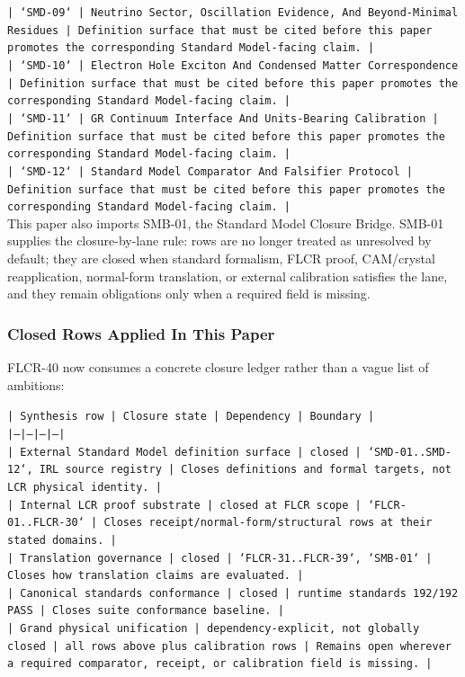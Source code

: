 \documentclass[11pt]{article}
\begin{document}
\noindent\texttt{| `SMD-09` | Neutrino Sector, Oscillation Evidence, And Beyond-Minimal Residues | Definition surface that must be cited before this paper promotes the corresponding Standard Model-facing claim. |}\\
\noindent\texttt{| `SMD-10` | Electron Hole Exciton And Condensed Matter Correspondence | Definition surface that must be cited before this paper promotes the corresponding Standard Model-facing claim. |}\\
\noindent\texttt{| `SMD-11` | GR Continuum Interface And Units-Bearing Calibration | Definition surface that must be cited before this paper promotes the corresponding Standard Model-facing claim. |}\\
\noindent\texttt{| `SMD-12` | Standard Model Comparator And Falsifier Protocol | Definition surface that must be cited before this paper promotes the corresponding Standard Model-facing claim. |}\\

This paper also imports SMB-01, the Standard Model Closure Bridge. SMB-01 supplies the closure-by-lane rule: rows are no longer treated as unresolved by default; they are closed when standard formalism, FLCR proof, CAM/crystal reapplication, normal-form translation, or external calibration satisfies the lane, and they remain obligations only when a required field is missing.

\subsubsection*{Closed Rows Applied In This Paper}

FLCR-40 now consumes a concrete closure ledger rather than a vague list of ambitions:

\noindent\texttt{| Synthesis row | Closure state | Dependency | Boundary |}\\
\noindent\texttt{|---|---|---|---|}\\
\noindent\texttt{| External Standard Model definition surface | closed | `SMD-01..SMD-12`, IRL source registry | Closes definitions and formal targets, not LCR physical identity. |}\\
\noindent\texttt{| Internal LCR proof substrate | closed at FLCR scope | `FLCR-01..FLCR-30` | Closes receipt/normal-form/structural rows at their stated domains. |}\\
\noindent\texttt{| Translation governance | closed | `FLCR-31..FLCR-39`, `SMB-01` | Closes how translation claims are evaluated. |}\\
\noindent\texttt{| Canonical standards conformance | closed | runtime standards 192/192 PASS | Closes suite conformance baseline. |}\\
\noindent\texttt{| Grand physical unification | dependency-explicit, not globally closed | all rows above plus calibration rows | Remains open wherever a required comparator, receipt, or calibration field is missing. |}\\
\end{document}
